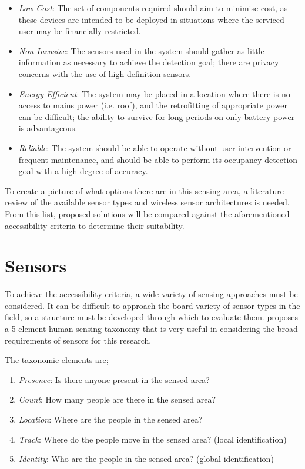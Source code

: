 \documentclass[../thesis/thesis.tex]{subfiles}
\begin{document}
\begin{itemize}
 \item \emph{Low Cost}: The set of components required should aim to minimise cost, as these devices are intended to be deployed in situations where the serviced user may be financially restricted.
 
 \item \emph{Non-Invasive}: The sensors used in the system should gather as little information as necessary to achieve the detection goal; there are privacy concerns with the use of high-definition sensors.
 
 \item \emph{Energy Efficient}: The system may be placed in a location where there is no access to mains power (i.e. roof), and the retrofitting of appropriate power can be difficult; the ability to survive for long periods on only battery power is advantageous.
 
 \item \emph{Reliable}: The system should be able to operate without user intervention or frequent maintenance, and should be able to perform its occupancy detection goal with a high degree of accuracy.
\end{itemize}

To create a picture of what options there are in this sensing area, a literature review of the available sensor types and wireless sensor architectures is needed. From this list, proposed solutions will be compared against the aforementioned accessibility criteria to determine their suitability.

\section{Sensors}
\label{sec:litreview:sensors}

To achieve the accessibility criteria, a wide variety of sensing approaches must be considered. It can be difficult to approach the board variety of sensor types in the field, so a structure must be developed through which to evaluate them. \cite{teixeira2010survey} proposes a 5-element human-sensing taxonomy that is very useful in considering the broad requirements of sensors for this research.

The taxonomic elements are;
\begin{enumerate}
 \item \emph{Presence}: Is there anyone present in the sensed area?
 \item \emph{Count}: How many people are there in the sensed area?
 \item \emph{Location}: Where are the people in the sensed area?
 \item \emph{Track}: Where do the people move in the sensed area? (local identification)
 \item \emph{Identity}: Who are the people in the sensed area? (global identification)
\end{enumerate}
\end{document}
